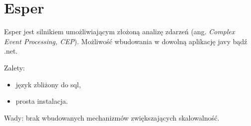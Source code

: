 \section{Esper}
Esper jest silnikiem umożliwiającym złożoną analizę zdarzeń (ang. \textit{Complex Event Processing, CEP}).
Możliwość wbudowania w dowolną aplikację javy bądź .net.

Zalety:
\begin{itemize}
  \item język zbliżony do sql,
  \item prosta instalacja.
\end{itemize}

Wady:
brak wbudowanych mechanizmów zwiększających skalowalność.
